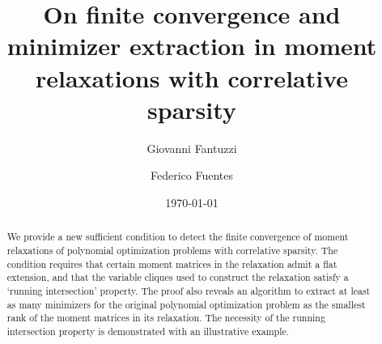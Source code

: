 \documentclass[a4paper]{amsart}
\title[Finite convergence in sparse moment relaxations]{On finite convergence and minimizer extraction in moment relaxations with correlative sparsity}
\author{Giovanni Fantuzzi}
\author{Federico Fuentes}
\date{\today}
\numberwithin{equation}{section}
\numberwithin{figure}{section}
\theoremstyle{plain}
\theoremstyle{definition}
\theoremstyle{remark}
\begin{document}
\begin{abstract}
We provide a new sufficient condition to detect the finite convergence of moment relaxations of polynomial optimization problems with correlative sparsity. The condition requires that certain moment matrices in the relaxation admit a flat extension, and that the variable cliques used to construct the relaxation satisfy a `running intersection' property. The proof also reveals an algorithm to extract at least as many minimizers for the original polynomial optimization problem as the smallest rank of the moment matrices in its relaxation. The necessity of the running intersection property is demonstrated with an illustrative example. 
\end{abstract}

\maketitle





\appendix





\end{document}
